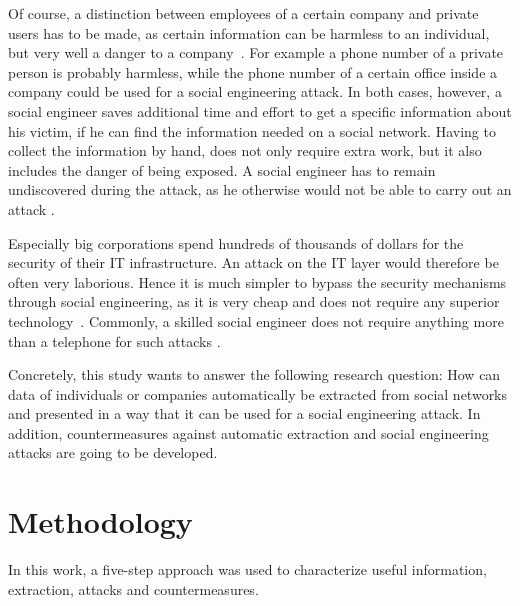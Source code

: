 Of course, a distinction between employees of a certain company and private
users has to be made, as certain information can be harmless to an
individual, but very well a danger to a company~\cite{mitnick2003}. For example
a phone number of a private person is probably harmless, while the phone number
of a certain office inside a company could be used for a social engineering
attack. In both cases, however, a social engineer saves additional time and
effort to get a specific information about his victim, if he can find the
information needed on a social network. Having to collect the
information by hand, does not only require extra work, but it also includes the
danger of being exposed. A social engineer has to remain undiscovered during
the attack, as he otherwise would not be able to carry out an attack
\cite{mitnick2003}.

Especially big corporations spend hundreds of thousands of dollars for the
security of their IT infrastructure. An attack on the IT layer would therefore
be often very laborious. Hence it is much simpler to bypass the security
mechanisms through social engineering, as it is very cheap and does not require
any superior technology~\cite{winkler1995}. Commonly, a skilled social
engineer does not require anything more than a telephone for such attacks
\cite{mitnick2003}.

Concretely, this study wants to answer the following research question:
How can data of individuals or companies automatically be extracted
from social networks and presented in a way that it can be used for a social
engineering attack. In addition, countermeasures against automatic extraction
and social engineering attacks are going to be developed.

\section{Methodology}

In this work, a five-step approach was used to characterize useful information,
extraction, attacks and countermeasures.

